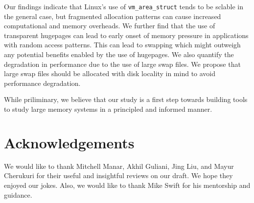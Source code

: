 \documentclass[twocolumn,11pt]{article}
\begin{document}
Our findings indicate that Linux's use of
\texttt{vm\_area\_struct} tends to be sclable in the general case, but
fragmented allocation patterns can cause increased computational and memory
overheads. We further find that the use of 
transparent hugepages can lead to early onset of memory pressure in applications
with random access patterns. 
This can lead to swapping which might outweigh any potential benefits enabled by the use of hugepages. 
We also quantify the degradation in performance due to the use of large swap
files. We propose that large swap files should be allocated with disk locality
in mind to avoid performance degradation.   

While priliminary, we believe that our study is a first step towards building tools 
to study large memory systems in a principled and informed manner. 
 

\section{Acknowledgements}

We would like to thank Mitchell Manar, Akhil Guliani, Jing Liu, and Mayur
Cherukuri for their useful and insightful reviews on our draft. We hope they
enjoyed our jokes. Also, we would like to thank Mike Swift for his mentorship
and guidance.


{}

\end{document}
